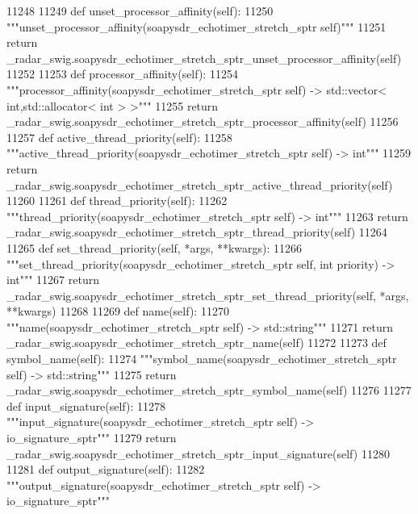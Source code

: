 \begin{DoxyCode}
{{{{{{{{{{{{{{{{{{{{{{{{{{{{{{{{{{{11248 
11249     \textcolor{keyword}{def }unset_processor_affinity(self):
11250         \textcolor{stringliteral}{"""unset\_processor\_affinity(soapysdr\_echotimer\_stretch\_sptr self)"""}
11251         \textcolor{keywordflow}{return} \_radar\_swig.soapysdr\_echotimer\_stretch\_sptr\_unset\_processor\_affinity(self)
11252 
11253     \textcolor{keyword}{def }processor_affinity(self):
11254         \textcolor{stringliteral}{"""processor\_affinity(soapysdr\_echotimer\_stretch\_sptr self) -> std::vector< int,std::allocator< int
       > >"""}
11255         \textcolor{keywordflow}{return} \_radar\_swig.soapysdr\_echotimer\_stretch\_sptr\_processor\_affinity(self)
11256 
11257     \textcolor{keyword}{def }active_thread_priority(self):
11258         \textcolor{stringliteral}{"""active\_thread\_priority(soapysdr\_echotimer\_stretch\_sptr self) -> int"""}
11259         \textcolor{keywordflow}{return} \_radar\_swig.soapysdr\_echotimer\_stretch\_sptr\_active\_thread\_priority(self)
11260 
11261     \textcolor{keyword}{def }thread_priority(self):
11262         \textcolor{stringliteral}{"""thread\_priority(soapysdr\_echotimer\_stretch\_sptr self) -> int"""}
11263         \textcolor{keywordflow}{return} \_radar\_swig.soapysdr\_echotimer\_stretch\_sptr\_thread\_priority(self)
11264 
11265     \textcolor{keyword}{def }set_thread_priority(self, *args, **kwargs):
11266         \textcolor{stringliteral}{"""set\_thread\_priority(soapysdr\_echotimer\_stretch\_sptr self, int priority) -> int"""}
11267         \textcolor{keywordflow}{return} \_radar\_swig.soapysdr\_echotimer\_stretch\_sptr\_set\_thread\_priority(self, *args, **kwargs)
11268 
11269     \textcolor{keyword}{def }name(self):
11270         \textcolor{stringliteral}{"""name(soapysdr\_echotimer\_stretch\_sptr self) -> std::string"""}
11271         \textcolor{keywordflow}{return} \_radar\_swig.soapysdr\_echotimer\_stretch\_sptr\_name(self)
11272 
11273     \textcolor{keyword}{def }symbol_name(self):
11274         \textcolor{stringliteral}{"""symbol\_name(soapysdr\_echotimer\_stretch\_sptr self) -> std::string"""}
11275         \textcolor{keywordflow}{return} \_radar\_swig.soapysdr\_echotimer\_stretch\_sptr\_symbol\_name(self)
11276 
11277     \textcolor{keyword}{def }input_signature(self):
11278         \textcolor{stringliteral}{"""input\_signature(soapysdr\_echotimer\_stretch\_sptr self) -> io\_signature\_sptr"""}
11279         \textcolor{keywordflow}{return} \_radar\_swig.soapysdr\_echotimer\_stretch\_sptr\_input\_signature(self)
11280 
11281     \textcolor{keyword}{def }output_signature(self):
11282         \textcolor{stringliteral}{"""output\_signature(soapysdr\_echotimer\_stretch\_sptr self) -> io\_signature\_sptr"""}
}}}}}}}}}}}}}}}}}}}}}}}}}}}}}}}}}}}
\end{DoxyCode}
